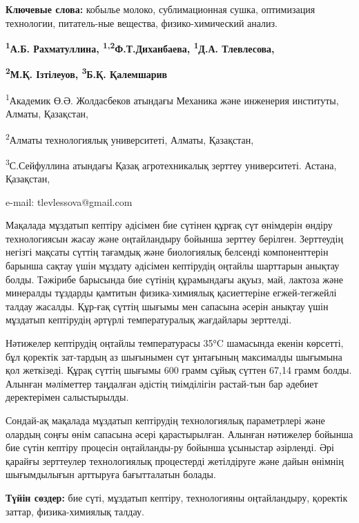 {\bfseries Ключевые слова:} кобылье молоко, сублимационная сушка,
оптимизация технологии, питатель-ные вещества, физико-химический анализ.

\begin{center}

{\bfseries \textsuperscript{1}А.Б. Рахматуллина,
\textsuperscript{1,2}Ф.Т.Диханбаева, \textsuperscript{1}Д.А.
Тлевлесова\envelope,}

{\bfseries \textsuperscript{2}М.Қ. Ізтілеуов, \textsuperscript{3}Б.Қ.
Қалемшарив}

\textsuperscript{1}Академик Ө.Ә. Жолдасбеков атындағы Механика және
инженерия институты, Алматы, Қазақстан,

\textsuperscript{2}Алматы технологиялық университеті, Алматы, Қазақстан,

\textsuperscript{3}С.Сейфуллина атындағы Қазақ агротехникалық зерттеу
университеті. Астана, Қазақстан,

e-mail: tlevlessova@gmail.com
\end{center}

Мақалада мұздатып кептіру әдісімен бие сүтінен құрғақ сүт өнімдерін
өндіру технологиясын жасау және оңтайландыру бойынша зерттеу берілген.
Зерттеудің негізгі мақсаты сүттің тағамдық және биологиялық белсенді
компоненттерін барынша сақтау үшін мұздату әдісімен кептірудің оңтайлы
шарттарын анықтау болды. Тәжірибе барысында бие сүтінің құрамындағы
ақуыз, май, лактоза және минералды тұздарды қамтитын физика-химиялық
қасиеттеріне егжей-тегжейлі талдау жасалды. Құр-ғақ сүттің шығымы мен
сапасына әсерін анықтау үшін мұздатып кептірудің әртүрлі температуралық
жағдайлары зерттелді.

Нәтижелер кептірудің оңтайлы температурасы 35°C шамасында екенін
көрсетті, бұл қоректік зат-тардың аз шығынымен сүт ұнтағының максималды
шығымына қол жеткізеді. Құрақ сүттің шығымы 600 грамм сұйық сүттен 67,14
грамм болды. Алынған мәліметтер таңдалған әдістің тиімділігін растай-тын
бар әдебиет деректерімен салыстырылды.

Сондай-ақ мақалада мұздатып кептірудің технологиялық параметрлері және
олардың соңғы өнім сапасына әсері қарастырылған. Алынған нәтижелер
бойынша бие сүтін кептіру процесін оңтайланды-ру бойынша ұсыныстар
әзірленді. Әрі қарайғы зерттеулер технологиялық процестерді жетілдіруге
және дайын өнімнің шығымдылығын арттыруға бағытталатын болады.

{\bfseries Түйін сөздер:} бие сүті, мұздатып кептіру, технологияны
оңтайландыру, қоректік заттар, физика-химиялық талдау.

